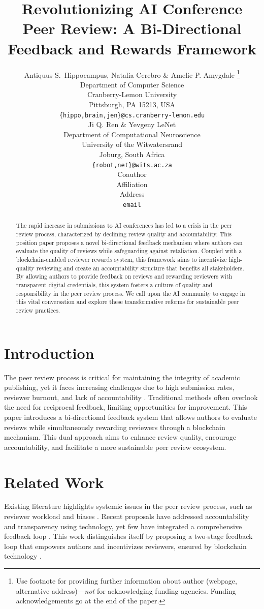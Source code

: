 \documentclass{article} %
\title{Revolutionizing AI Conference Peer Review: A Bi-Directional Feedback and Rewards Framework}
\author{Antiquus S.~Hippocampus, Natalia Cerebro \& Amelie P. Amygdale \thanks{ Use footnote for providing further information
about author (webpage, alternative address)---\emph{not} for acknowledging
funding agencies.  Funding acknowledgements go at the end of the paper.} \\
Department of Computer Science\\
Cranberry-Lemon University\\
Pittsburgh, PA 15213, USA \\
\texttt{\{hippo,brain,jen\}@cs.cranberry-lemon.edu} \\
\And
Ji Q. Ren \& Yevgeny LeNet \\
Department of Computational Neuroscience \\
University of the Witwatersrand \\
Joburg, South Africa \\
\texttt{\{robot,net\}@wits.ac.za} \\
\AND
Coauthor \\
Affiliation \\
Address \\
\texttt{email}
}
\begin{document}
\maketitle

\begin{abstract}
The rapid increase in submissions to AI conferences has led to a crisis in the peer review process, characterized by declining review quality and accountability. This position paper proposes a novel bi-directional feedback mechanism where authors can evaluate the quality of reviews while safeguarding against retaliation. Coupled with a blockchain-enabled reviewer rewards system, this framework aims to incentivize high-quality reviewing and create an accountability structure that benefits all stakeholders. By allowing authors to provide feedback on reviews and rewarding reviewers with transparent digital credentials, this system fosters a culture of quality and responsibility in the peer review process. We call upon the AI community to engage in this vital conversation and explore these transformative reforms for sustainable peer review practices.
\end{abstract}

\section{Introduction}
The peer review process is critical for maintaining the integrity of academic publishing, yet it faces increasing challenges due to high submission rates, reviewer burnout, and lack of accountability \citep{kim2025positionta,mishra2025challengesit}. Traditional methods often overlook the need for reciprocal feedback, limiting opportunities for improvement. This paper introduces a bi-directional feedback system that allows authors to evaluate reviews while simultaneously rewarding reviewers through a blockchain mechanism. This dual approach aims to enhance review quality, encourage accountability, and facilitate a more sustainable peer review ecosystem.

\section{Related Work}
Existing literature highlights systemic issues in the peer review process, such as reviewer workload and biases \citep{mishra2025challengesit}. Recent proposals have addressed accountability and transparency using technology, yet few have integrated a comprehensive feedback loop \citep{v2025enhancingat,shrestha2024acs}. This work distinguishes itself by proposing a two-stage feedback loop that empowers authors and incentivizes reviewers, ensured by blockchain technology \citep{wardani2025applicationob}.
\end{document}
